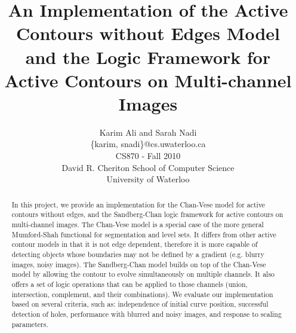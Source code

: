 \documentclass[10pt,twocolumn,letterpaper]{article}
\begin{document}
\title{An Implementation of the Active Contours without Edges Model and the Logic Framework for Active Contours on Multi-channel Images}

\author{Karim Ali and Sarah Nadi\\
\{karim, snadi\}@cs.uwaterloo.ca \\
CS870 - Fall 2010\\
David R. Cheriton School of Computer Science\\
University of Waterloo\\
}

\maketitle

\begin{abstract}
In this project, we provide an implementation for the Chan-Vese model for active contours without edges, and the Sandberg-Chan logic framework for active
contours on multi-channel images. The Chan-Vese model is a special case of the more general Mumford-Shah functional for segmentation and level sets. It
differs
from other active contour models in that it is not edge dependent, therefore it is more capable of detecting objects whose
boundaries may not be defined by a gradient (e.g. blurry images, noisy images). The Sandberg-Chan model builds on top of the Chan-Vese model by allowing the
contour to evolve simultaneously on multiple channels. It also offers a set of logic operations that can be applied to those channels (union, intersection,
complement, and their combinations). We evaluate our implementation based on several criteria, such as: independence of initial curve position, successful
detection of holes, performance with blurred and noisy images, and response to scaling parameters.
\end{abstract}
\end{document}
